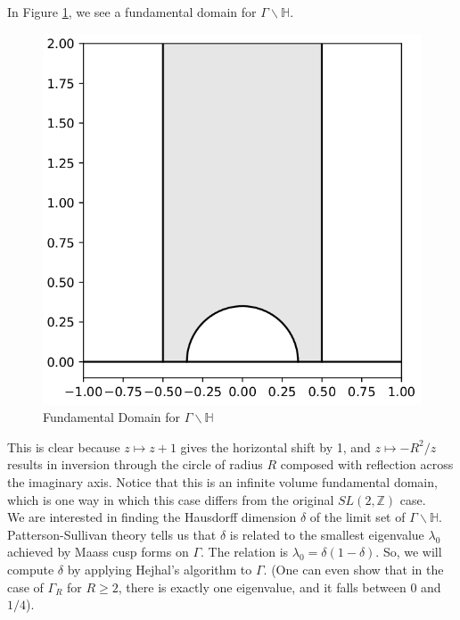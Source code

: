 \documentclass[]{article}
\begin{document}
In Figure \ref{fundDomain}, we see a fundamental domain for $\Gamma\backslash\mathbb{H}$.
\begin{figure}[h]
	\centering
	\includegraphics[width=0.7\linewidth]{fundDomainGamma.png}
	\caption{Fundamental Domain for $\Gamma\backslash\mathbb{H}$}
	\label{fundDomain}
\end{figure}
This is clear because $z \mapsto z + 1$ gives the horizontal shift by 1, and $z \mapsto -R^2/z$ results in inversion through the circle of radius $R$ composed with reflection across the imaginary axis.
Notice that this is an infinite volume fundamental domain, which is one way in which this case differs from the original $SL(2, \mathbb{Z})$ case.
\\

We are interested in finding the Hausdorff dimension $\delta$ of the limit set of $\Gamma\backslash\mathbb{H}$.
Patterson-Sullivan theory tells us that $\delta$ is related to the smallest eigenvalue $\lambda_0$ achieved by Maass cusp forms on $\Gamma$.
The relation is $\lambda_0 = \delta(1 - \delta)$.
So, we will compute $\delta$ by applying Hejhal's algorithm to $\Gamma$.
(One can even show that in the case of $\Gamma_R$ for $R \geq 2$, there is exactly one eigenvalue, and it falls between $0$ and $1/4$).
\\
\end{document}

